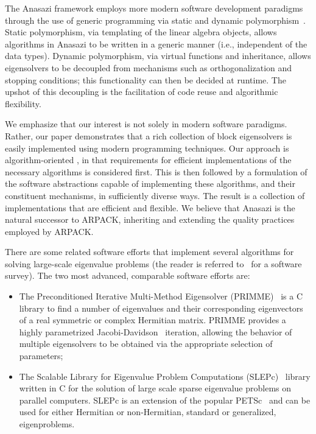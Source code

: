 \documentclass[acmtoms]{acmtrans2m}
\newcounter{algorithm}
\begin{document}
The Anasazi framework employs more modern software development paradigms through the use
of generic programming via static and dynamic polymorphism~\cite[Chapter 14]{VJ02}. Static
polymorphism, via templating of the linear algebra objects, allows algorithms in Anasazi
to be written in a generic manner (i.e., independent of the data types). Dynamic
polymorphism, via virtual functions and inheritance, allows eigensolvers to be decoupled
from mechanisms such as orthogonalization and stopping conditions; this functionality can
then be decided at runtime. The upshot of this decoupling is the facilitation of code
reuse and algorithmic flexibility.

We emphasize that our interest is not solely in modern software paradigms. Rather, our
paper demonstrates that a rich collection of block eigensolvers is easily implemented
using modern programming techniques. Our approach is algorithm-oriented \cite{muov:94}, in
that requirements for efficient implementations of the necessary algorithms is considered
first. This is then followed by a formulation of the software abstractions capable of
implementing these algorithms, and their constituent mechanisms, in sufficiently diverse
ways. The result is a collection of implementations that are efficient and flexible. We
believe that Anasazi is the natural successor to ARPACK, inheriting and extending the
quality practices employed by ARPACK.

There are some related software efforts that implement several algorithms for solving
large-scale eigenvalue problems (the reader is referred to~\cite{slepc:05}
for a software survey).  The two most advanced, comparable software efforts are:
\begin{itemize}
\item
The Preconditioned Iterative Multi-Method Eigensolver (PRIMME)~\cite{primme:06} is a C
library to find a number of eigenvalues and their corresponding eigenvectors of a real
symmetric or complex Hermitian matrix. PRIMME provides a highly parametrized
Jacobi-Davidson~\cite{slvo:96} iteration, allowing the behavior of multiple eigensolvers
to be obtained via the appropriate selection of parameters;
\item
The Scalable Library for Eigenvalue Problem Computations (SLEPc)~\cite{slepc:06} library
written in C for the solution of large scale sparse eigenvalue problems on parallel
computers. SLEPc is an extension of the popular PETSc~\cite{petsc-web-page} and can be
used for either Hermitian or non-Hermitian, standard or generalized, eigenproblems.
\end{itemize}
\end{document}
